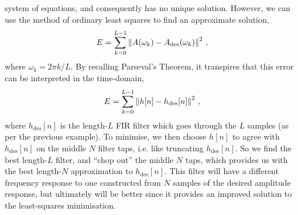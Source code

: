 system of equations, and consequently has no unique solution. However,
we can use the method of ordinary least squares to find an approximate
solution,
%
\begin{displaymath}
  E = \sum_{k=0}^{L-1}\left\lVert A(\omega_k) - A_\mathrm{des}(\omega_k)\right\rVert^2 \,,
\end{displaymath}
%
where $\omega_k = 2\pi k/L$. By recalling Parseval's Theorem, it transpires
that this error can be interpreted in the time-domain,
%
\begin{displaymath}
  E = \sum_{k=0}^{L-1} \left\lVert h[n] - h_\mathrm{des}[n]\right\rVert^2 \,,
\end{displaymath}
%
where $h_\mathrm{des}[n]$ is the length-$L$ FIR filter which goes through
the $L$ samples (as per the previous example). To minimise, we then choose
$h[n]$ to agree with $h_\mathrm{des}[n]$ on the middle $N$ filter taps, i.e.
like truncating $h_\mathrm{des}[n]$. So we find the best length-$L$ filter,
and ``chop out'' the middle $N$ taps, which provides us with the best
length-$N$ approximation to $h_\mathrm{des}[n]$. This filter will have
a different frequency response to one constructed from $N$ samples of
the desired amplitude response, but ultimately will be better since
it provides an improved solution to the least-squares minimisation.

